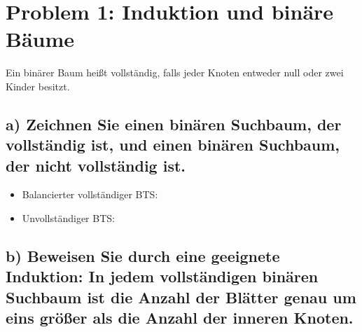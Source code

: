 \section*{{Problem 1: Induktion und binäre Bäume}}
Ein binärer Baum heißt vollständig, falls jeder Knoten entweder null oder zwei Kinder besitzt.

\subsection*{a) Zeichnen Sie einen binären Suchbaum, der vollständig ist, und einen binären Suchbaum, der nicht vollständig ist.} 

\begin{answer}
\begin{itemize}
	\item Balancierter vollständiger BTS:
\end{itemize}

\begin{itemize}
	\item Unvollständiger BTS:
\end{itemize}


\end{answer}

\subsection*{b) Beweisen Sie durch eine geeignete Induktion: In jedem vollständigen binären Suchbaum ist die Anzahl der Blätter genau um eins größer als die Anzahl der inneren Knoten.} 

